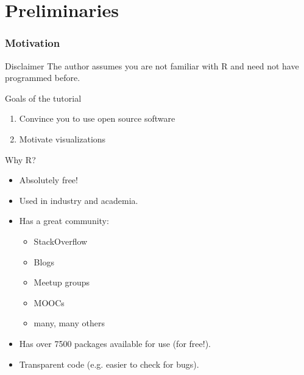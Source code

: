 \part{Preliminaries}
\section{Motivation}
\normalfont
\begin{frame}
	\begin{center}
  		\begin{block}{Disclaimer} 
The author assumes you are not familiar with \ttfamily R \normalfont and need not have programmed before. \\
		\end{block}
	\end{center} 
\end{frame}

\begin{frame}
	\begin{center}
  		\begin{block}{Goals of the tutorial} 
			\begin{enumerate}
				\item Convince you to use open source software
				\item Motivate visualizations
			\end{enumerate}
		\end{block}
	\end{center}
\end{frame}

\begin{frame}
	\begin{center}
  		\begin{block}{Why R?} 
			\begin{itemize}
				\item Absolutely free!
				\item Used in industry and academia.
				\item Has a great community:
					\begin{itemize}
						\item StackOverflow
						\item Blogs
						\item Meetup groups
						\item MOOCs
						\item many, many others
					\end{itemize}
				\item Has over 7500 packages available for use (for free!).
				\item Transparent code (e.g. easier to check for bugs).
			\end{itemize}
		\end{block}
	\end{center} 
\end{frame}


